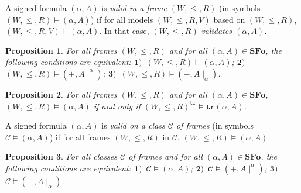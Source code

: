 \documentclass[draft]{article}
\newtheorem{proposition}{Proposition}
\newenvironment{proof}{{\bf Proof:}}{~$\dashv$\\}
\def\Fo{\mathbf{Fo}}
\def\SFo{\mathbf{SFo}}
\begin{document}
%
%
%
%
%
%
%
%
A signed formula $(\alpha,A)$ is {\em valid in a frame $(W,{\leq},{R})$}\/ (in symbols $(W,{\leq},{R}){\models}(\alpha,A)$) if for all models $(W,{\leq},{R},V)$ based on $(W,{\leq},{R})$, $(W,{\leq},{R},V){\models}(\alpha,A)$.
In that case, $(W,{\leq},{R})$ {\em validates $(\alpha,A)$.}
%
%
\begin{proposition}\label{proposition:about:validity:and:signs:of:signed:formulas}
%
%
For all frames $(W,{\leq},{R})$ and for all $(\alpha,A){\in}\SFo$, the following conditions are equivalent: $\mathbf{1)}$~$(W,{\leq},{R}){\models}(\alpha,A)$; $\mathbf{2)}$~$(W,{\leq},{R}){\models}(+,A{\mid}^{\alpha})$; $\mathbf{3)}$~$(W,{\leq},{R})
%
%
%
%
%
%
%
$\linebreak$
%
%
%
%
%
%
{\models}(-,A{\mid}_{\alpha})$.
%
%
\end{proposition}
%
%
%
%
%
%
%
%
%
%
\begin{proposition}\label{Proposition:about:duality:complement:valuation:transpose:formulas:validity:frame}
%
%
For all frames $(W,{\leq},{R})$ and for all $(\alpha,A){\in}\SFo$, $(W,{\leq},{R}){\models}(\alpha,A)$ if and only if $(W,{\leq},{R})^{\mathtt{tr}}{\models}\mathtt{tr}(\alpha,A)$.
%
%
\end{proposition}
%
%
%
%
%
%
%
%
%
%
A signed formula $(\alpha,A)$ is {\em valid on a class ${\mathcal C}$ of frames}\/ (in symbols ${\mathcal C}{\models}(\alpha,A)$) if for all frames $(W,{\leq},{R})$ in ${\mathcal C}$, $(W,{\leq},{R}){\models}(\alpha,A)$.
%
%
\begin{proposition}\label{Proposition:about:duality:complement:valuation:transpose:formulas:validity:class:of:frames}
%
%
For all classes ${\mathcal C}$ of frames and for all $(\alpha,A){\in}\SFo$, the following conditions are equivalent: $\mathbf{1)}$~${\mathcal C}{\models}(\alpha,A)$; $\mathbf{2)}$~${\mathcal C}{\models}(+,A{\mid}^{\alpha})$; $\mathbf{3)}$~${\mathcal C}{\models}(-,A{\mid}_{\alpha})$.
%
%
\end{proposition}
\end{document}
